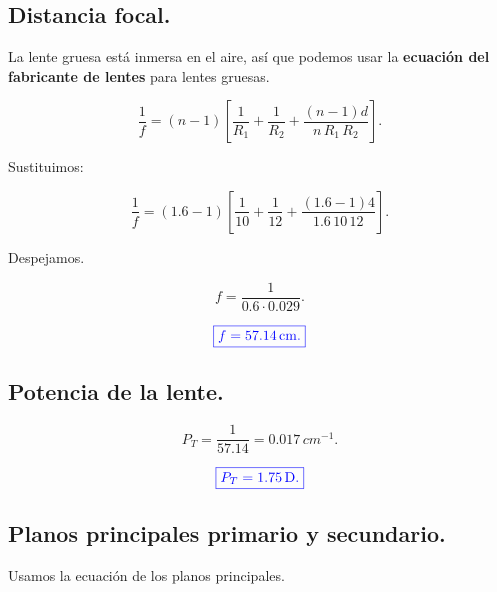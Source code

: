 \documentclass[a4paper,12pt]{article} %
\begin{document}
\vspace{\baselineskip}

\subsection{Distancia focal.}

\begin{justify}
	La lente gruesa está inmersa en el aire, así que podemos usar la \textbf{ecuación del fabricante de lentes} para lentes gruesas.
\end{justify}

\[ \frac{1}{f} = \left(n-1\right) \left[\frac{1}{R_1} + \frac{1}{R_2} + \frac{\left(n-1\right)d}{n \, R_1 \, R_2}\right]. \]

\begin{justify}
	Sustituimos:
\end{justify}

\[ \frac{1}{f} = \left(1.6 - 1 \right) \left[\frac{1}{10} + \frac{1}{12} + \frac{\left(1.6-1\right)4}{1.6 \, 10 \, 12}\right]. \]

\begin{justify}
	Despejamos.
\end{justify}

\[ f = \frac{1}{0.6 \cdot 0.029}. \]

\vspace{\baselineskip}

\[\textcolor{blue}{\boxed{f = 57.14 \, \mathrm{cm}.}} \]

\vspace{\baselineskip}

\subsection{Potencia de la lente.}

\[P_T = \frac{1}{57.14} = 0.017 \, cm^{-1}.\]

\vspace{\baselineskip}

\[\textcolor{blue}{\boxed{P_T = 1.75 \, \mathrm{D}.}}\]

\vspace{\baselineskip}

\subsection{Planos principales primario y secundario.}

\begin{justify}
	Usamos la ecuación de los planos principales.
\end{justify}
\end{document}
